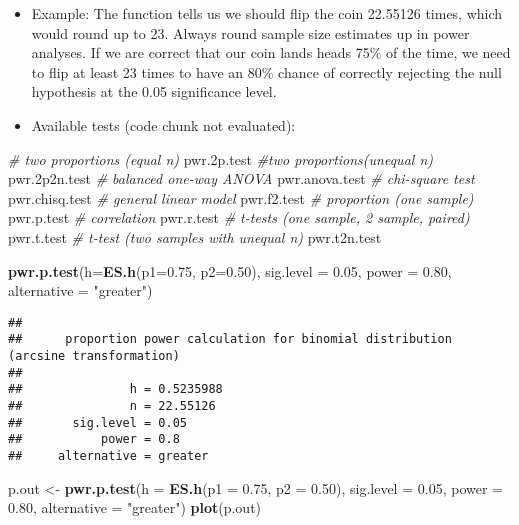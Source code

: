 \documentclass[
]{article}
\newenvironment{Shaded}{\begin{snugshade}}{\end{snugshade}}
\newcommand{\CommentTok}[1]{\textcolor[rgb]{0.56,0.35,0.01}{\textit{#1}}}
\newcommand{\DataTypeTok}[1]{\textcolor[rgb]{0.13,0.29,0.53}{#1}}
\newcommand{\FloatTok}[1]{\textcolor[rgb]{0.00,0.00,0.81}{#1}}
\newcommand{\KeywordTok}[1]{\textcolor[rgb]{0.13,0.29,0.53}{\textbf{#1}}}
\newcommand{\NormalTok}[1]{#1}
\newcommand{\StringTok}[1]{\textcolor[rgb]{0.31,0.60,0.02}{#1}}
\begin{document}
\begin{itemize}
\item
  Example: The function tells us we should flip the coin 22.55126 times,
  which would round up to 23. Always round sample size estimates up in
  power analyses. If we are correct that our coin lands heads 75\% of
  the time, we need to flip at least 23 times to have an 80\% chance of
  correctly rejecting the null hypothesis at the 0.05 significance
  level.
\item
  Available tests (code chunk not evaluated):
\end{itemize}

\begin{Shaded}
\begin{Highlighting}[]
\CommentTok{#  two proportions (equal n)}
\NormalTok{pwr}\FloatTok{.2}\NormalTok{p.test}
\CommentTok{#two proportions(unequal n)}
\NormalTok{pwr}\FloatTok{.2}\NormalTok{p2n.test}
\CommentTok{# balanced one-way ANOVA}
\NormalTok{pwr.anova.test}
\CommentTok{# chi-square test}
\NormalTok{pwr.chisq.test}
\CommentTok{# general linear model}
\NormalTok{pwr.f2.test}
\CommentTok{# proportion (one sample)}
\NormalTok{pwr.p.test}
\CommentTok{# correlation}
\NormalTok{pwr.r.test}
\CommentTok{#  t-tests (one sample, 2 sample, paired)}
\NormalTok{pwr.t.test}
\CommentTok{# t-test (two samples with unequal n)}
\NormalTok{pwr.t2n.test}
\end{Highlighting}
\end{Shaded}

\begin{Shaded}
\begin{Highlighting}[]
\KeywordTok{pwr.p.test}\NormalTok{(}\DataTypeTok{h=}\KeywordTok{ES.h}\NormalTok{(}\DataTypeTok{p1=}\FloatTok{0.75}\NormalTok{, }\DataTypeTok{p2=}\FloatTok{0.50}\NormalTok{), }
           \DataTypeTok{sig.level =} \FloatTok{0.05}\NormalTok{,}
           \DataTypeTok{power =} \FloatTok{0.80}\NormalTok{, }
           \DataTypeTok{alternative =} \StringTok{"greater"}\NormalTok{)}
\end{Highlighting}
\end{Shaded}

\begin{verbatim}
## 
##      proportion power calculation for binomial distribution (arcsine transformation) 
## 
##               h = 0.5235988
##               n = 22.55126
##       sig.level = 0.05
##           power = 0.8
##     alternative = greater
\end{verbatim}

\begin{Shaded}
\begin{Highlighting}[]
\NormalTok{p.out <-}\StringTok{ }\KeywordTok{pwr.p.test}\NormalTok{(}\DataTypeTok{h =} \KeywordTok{ES.h}\NormalTok{(}\DataTypeTok{p1 =} \FloatTok{0.75}\NormalTok{, }\DataTypeTok{p2 =} \FloatTok{0.50}\NormalTok{),}
                    \DataTypeTok{sig.level =} \FloatTok{0.05}\NormalTok{,}
                    \DataTypeTok{power =} \FloatTok{0.80}\NormalTok{,}
                    \DataTypeTok{alternative =} \StringTok{"greater"}\NormalTok{)}
\KeywordTok{plot}\NormalTok{(p.out)}
\end{Highlighting}
\end{Shaded}
\end{document}
